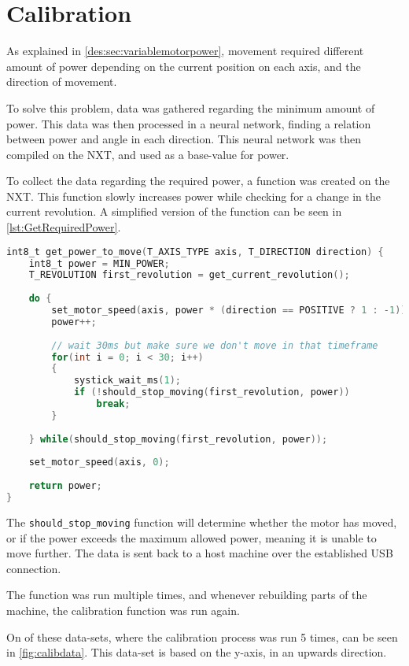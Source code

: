 \section{Calibration}\label{sec:calibration}
As explained in \autoref{des:sec:variablemotorpower}, movement required different amount of power depending on the current position on each axis, and the direction of movement.


To solve this problem, data was gathered regarding the minimum amount of power.
This data was then processed in a neural network, finding a relation between power and angle in each direction.
This neural network was then compiled on the NXT, and used as a base-value for power.

To collect the data regarding the required power, a function was created on the NXT.
This function slowly increases power while checking for a change in the current revolution. 
A simplified version of the function can be seen in \autoref{lst:GetRequiredPower}.


\begin{lstlisting}[language=C,label={lst:GetRequiredPower},caption={Getting required power to move }]
int8_t get_power_to_move(T_AXIS_TYPE axis, T_DIRECTION direction) {
	int8_t power = MIN_POWER;
	T_REVOLUTION first_revolution = get_current_revolution();
	
	do {
		set_motor_speed(axis, power * (direction == POSITIVE ? 1 : -1));
		power++;
		
		// wait 30ms but make sure we don't move in that timeframe
		for(int i = 0; i < 30; i++)
		{
			systick_wait_ms(1);
			if (!should_stop_moving(first_revolution, power))
				break;
		}
	
	} while(should_stop_moving(first_revolution, power));
	
	set_motor_speed(axis, 0);
	
	return power;
}

\end{lstlisting}

The \texttt{should\_stop\_moving} function will determine whether the motor has moved, or if the power exceeds the maximum allowed power, meaning it is unable to move further.
The data is sent back to a host machine over the established USB connection.

The function was run multiple times, and whenever rebuilding parts of the machine, the calibration function was run again.

On of these data-sets, where the calibration process was run 5 times, can be seen in \autoref{fig:calibdata}.
This data-set is based on the y-axis, in an upwards direction.



